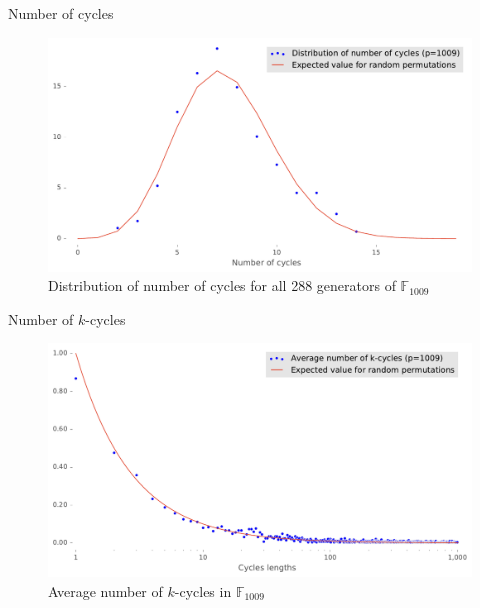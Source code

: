 \begin{frame}{Number of cycles}
    \begin{figure}
        \centering
        \includegraphics[width=\textwidth]{figures/distribution_of_number_of_cycles_p_1009}
        \caption{Distribution of number of cycles for all 288 generators of $\mathbb{F}_{1009}$}
        \label{fig:elgamalPermCycles}
    \end{figure}
\end{frame}

\begin{frame}{Number of $k$-cycles}
    \begin{figure}
        \centering
        \includegraphics[width=\textwidth]{figures/average_number_of_k_cycles_p_1009}
        \caption{Average number of $k$-cycles in $\mathbb{F}_{1009}$}
        \label{fig:kcycles}
    \end{figure}
\end{frame}

